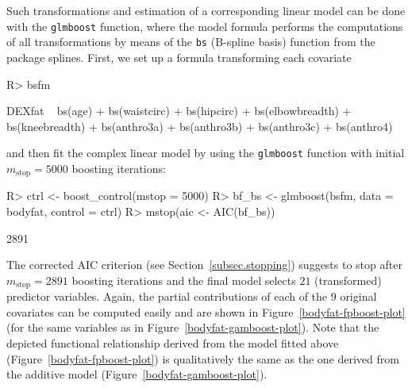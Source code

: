 \documentclass{article}
\newcommand{\Rpackage}[1]{{\normalfont\fontseries{b}\selectfont #1}}
\newcommand{\Rcmd}[1]{\texttt{#1}}
\newenvironment{Schunk}{}{}
\begin{document}
Such transformations and estimation of a corresponding linear model can be
done with the \Rcmd{glmboost} function,
where the model formula performs the computations of all transformations by 
means of the \Rcmd{bs} (B-spline basis) function from the package
\Rpackage{splines}.  
First, we set up a formula transforming each covariate 
\begin{Schunk}
\begin{Sinput}
R> bsfm
\end{Sinput}
\begin{Soutput}
DEXfat ~ bs(age) + bs(waistcirc) + bs(hipcirc) + bs(elbowbreadth) + 
    bs(kneebreadth) + bs(anthro3a) + bs(anthro3b) + bs(anthro3c) + 
    bs(anthro4)
\end{Soutput}
\end{Schunk}
and then fit the complex linear model by using the \Rcmd{glmboost} function with 
initial $m_\text{stop} = 5000$ boosting iterations:
\begin{Schunk}
\begin{Sinput}
R> ctrl <- boost_control(mstop = 5000)
R> bf_bs <- glmboost(bsfm, data = bodyfat, control = ctrl)
R> mstop(aic <- AIC(bf_bs))
\end{Sinput}
\begin{Soutput}
[1] 2891
\end{Soutput}
\end{Schunk}
The corrected AIC criterion (see Section~\ref{subsec.stopping}) suggests to
stop after $m_\text{stop} = 2891$ 
boosting iterations and the final model selects
$21$ (transformed) predictor
variables. Again, the partial 
contributions of each of the $9$ original covariates
can be computed 
easily and are shown in Figure~\ref{bodyfat-fpboost-plot} (for the same
variables as in Figure~\ref{bodyfat-gamboost-plot}). Note that the depicted
functional relationship derived from the model fitted above
(Figure~\ref{bodyfat-fpboost-plot}) is qualitatively the same as the one
derived from the additive model (Figure~\ref{bodyfat-gamboost-plot}).
\end{document}
